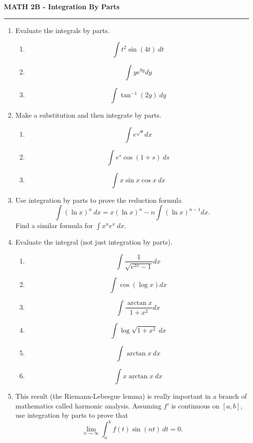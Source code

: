 \documentclass[12pt]{article}
\begin{document}
\begin{center}
{\bf \Large MATH 2B - Integration By Parts}
\vspace{0.2cm}
\hrule
\end{center}

\begin{multicols*}{2}
	\begin{enumerate}
		\item Evaluate the integrals by parts.
		\begin{enumerate}
			\item \[
			\int t^2 \sin (4t)\ dt
			\]
			\vfill
			\item \[
			\int ye^{9y}dy
			\]
			\vfill
			\item \[
			\int \tan^{-1}(2y)\ dy
			\]
		\end{enumerate}
		\vfill
		\item Make a substitution and then integrate by parts.
		\begin{enumerate}
			\item \[
			\int e^{\sqrt x}dx
			\]
			\vfill
			\item \[
			\int e^s\cos(1+s)\ ds
			\]
			\vfill
			\item \[
			\int x\sin x\cos x\ dx
			\]
			\vfill
		\end{enumerate}
		\item Use integration by parts to prove the reduction formula
		\[
		\int (\ln x)^n\ dx = x(\ln x)^n - n\int(\ln x)^{n-1}dx.
		\]
		Find a similar formula for $\int x^ne^x\ dx$.
		\vfill\null\columnbreak
		\item Evaluate the integral (not just integration by parts).
		\begin{enumerate}
			\item \[
			\int \frac{1}{\sqrt{e^{2x}-1}}dx
			\]
			\vfill
			\item \[
			\int \cos(\log x) dx
			\]
			\vfill
			\item \[
			\int \frac{\arctan x}{1+x^2}dx
			\]
			\vfill
			\item \[
			\int \log \sqrt{1+x^2}\ dx
			\]
			\vfill
			\item \[
			\int \arctan x\ dx
			\]
			\vfill
			\item \[
			\int x\arctan x\ dx
			\]
			\vfill
		\end{enumerate}
		\item This result (the Riemann-Lebesgue lemma) is really important in a branch of mathematics called harmonic analysis. Assuming $f'$ is continuous on $[a,b]$, use integration by parts to prove that
		\[
		\lim_{n\to \infty}\int_a^bf(t)\sin(nt)\ dt = 0.
		\]
		\vfill
	\end{enumerate}	
\end{multicols*}
\end{document}
